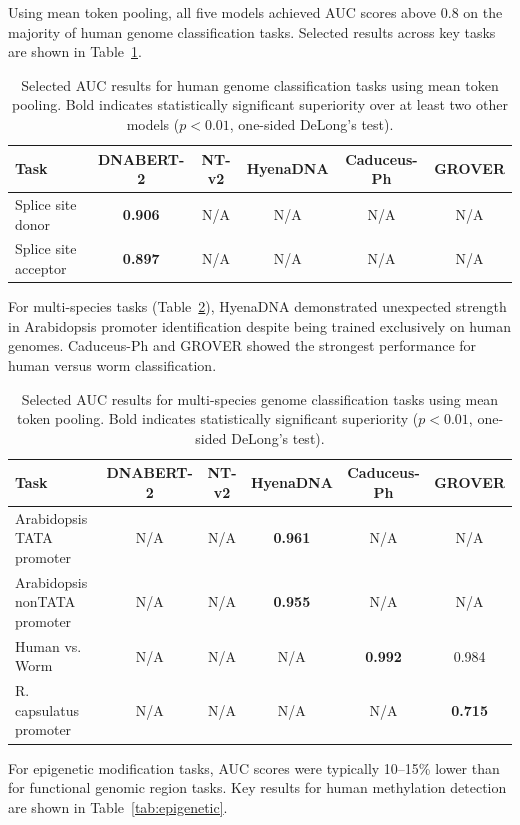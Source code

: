 \documentclass[11pt]{article}
\begin{document}
Using mean token pooling, all five models achieved AUC scores above 0.8 on the majority of human genome classification tasks. Selected results across key tasks are shown in Table~\ref{tab:human_class}.

\begin{table}[htbp]
\centering
\caption{Selected AUC results for human genome classification tasks using mean token pooling. Bold indicates statistically significant superiority over at least two other models ($p < 0.01$, one-sided DeLong's test).}
\label{tab:human_class}
\begin{tabular}{lccccc}
\toprule
Task & DNABERT-2 & NT-v2 & HyenaDNA & Caduceus-Ph & GROVER \\
\midrule
Splice site donor & \textbf{0.906} & N/A & N/A & N/A & N/A \\
Splice site acceptor & \textbf{0.897} & N/A & N/A & N/A & N/A \\
\bottomrule
\end{tabular}
\end{table}

For multi-species tasks (Table~\ref{tab:multi_class}), HyenaDNA demonstrated unexpected strength in Arabidopsis promoter identification despite being trained exclusively on human genomes. Caduceus-Ph and GROVER showed the strongest performance for human versus worm classification.

\begin{table}[htbp]
\centering
\caption{Selected AUC results for multi-species genome classification tasks using mean token pooling. Bold indicates statistically significant superiority ($p < 0.01$, one-sided DeLong's test).}
\label{tab:multi_class}
\begin{tabular}{lccccc}
\toprule
Task & DNABERT-2 & NT-v2 & HyenaDNA & Caduceus-Ph & GROVER \\
\midrule
Arabidopsis TATA promoter & N/A & N/A & \textbf{0.961} & N/A & N/A \\
Arabidopsis nonTATA promoter & N/A & N/A & \textbf{0.955} & N/A & N/A \\
Human vs. Worm & N/A & N/A & N/A & \textbf{0.992} & 0.984 \\
R. capsulatus promoter & N/A & N/A & N/A & N/A & \textbf{0.715} \\
\bottomrule
\end{tabular}
\end{table}

For epigenetic modification tasks, AUC scores were typically 10--15\% lower than for functional genomic region tasks. Key results for human methylation detection are shown in Table~\ref{tab:epigenetic}.
\end{document}
